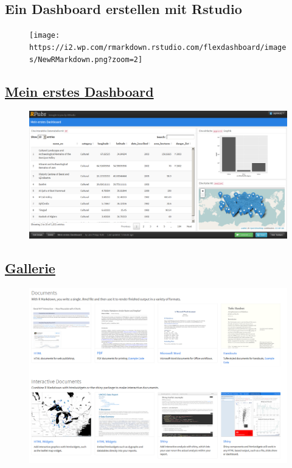 \documentclass[]{article}
\begin{document}
\subsection{Ein Dashboard erstellen mit
Rstudio}\label{ein-dashboard-erstellen-mit-rstudio}

\begin{figure}
\centering
\texttt{[image: https://i2.wp.com/rmarkdown.rstudio.com/flexdashboard/images/NewRMarkdown.png?zoom=2]}
\caption{}
\end{figure}

\subsection{\texorpdfstring{\href{http://rpubs.com/Japhilko82/whcsites}{\textbf{Mein
erstes Dashboard}}}{Mein erstes Dashboard}}\label{mein-erstes-dashboard}

\begin{figure}
\centering
\includegraphics{figure/MeinErstesDashboard.PNG}
\caption{}
\end{figure}

\subsection{\texorpdfstring{\href{http://rmarkdown.rstudio.com/gallery.html}{\textbf{Gallerie}}}{Gallerie}}\label{gallerie}

\begin{figure}
\centering
\includegraphics{figure/RmarkdownGallery.PNG}
\caption{}
\end{figure}
\end{document}
